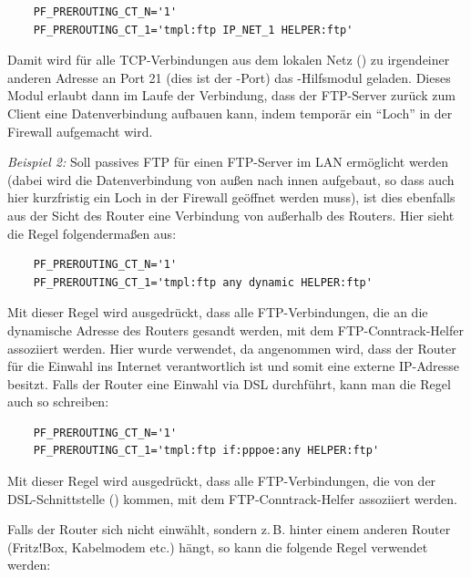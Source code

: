 \begin{example}
\begin{verbatim}
    PF_PREROUTING_CT_N='1'
    PF_PREROUTING_CT_1='tmpl:ftp IP_NET_1 HELPER:ftp'
\end{verbatim}
\end{example}

  Damit wird für alle TCP-Verbindungen aus dem lokalen Netz ()
  zu irgendeiner anderen Adresse an Port 21 (dies ist der -Port)
  das -Hilfsmodul geladen. Dieses Modul erlaubt dann im Laufe
  der Verbindung, dass der FTP-Server zurück zum Client eine Datenverbindung
  aufbauen kann, indem temporär ein ``Loch'' in der Firewall aufgemacht wird.

  \emph{Beispiel 2:} Soll passives FTP für einen FTP-Server im LAN ermöglicht
  werden (dabei wird die Datenverbindung von außen nach innen aufgebaut, so
  dass auch hier kurzfristig ein Loch in der Firewall geöffnet werden muss),
  ist dies ebenfalls aus der Sicht des Router eine Verbindung von außerhalb des
  Routers. Hier sieht die Regel folgendermaßen aus:

\begin{example}
\begin{verbatim}
    PF_PREROUTING_CT_N='1'
    PF_PREROUTING_CT_1='tmpl:ftp any dynamic HELPER:ftp'
\end{verbatim}
\end{example}

  Mit dieser Regel wird ausgedrückt, dass alle FTP-Verbindungen, die an die
  dynamische Adresse des Routers gesandt werden, mit dem FTP-Conntrack-Helfer
  assoziiert werden. Hier wurde  verwendet, da angenommen
  wird, dass der Router für die Einwahl ins Internet verantwortlich ist und
  somit eine externe IP-Adresse besitzt. Falls der Router eine Einwahl via
  DSL durchführt, kann man die Regel auch so schreiben:
  
\begin{example}
\begin{verbatim}
    PF_PREROUTING_CT_N='1'
    PF_PREROUTING_CT_1='tmpl:ftp if:pppoe:any HELPER:ftp'
\end{verbatim}
\end{example}

  Mit dieser Regel wird ausgedrückt, dass alle FTP-Verbindungen, die von der
  DSL-Schnitt\-stelle () kommen, mit dem FTP-Conntrack-Helfer
  assoziiert werden.

  Falls der Router sich nicht einwählt, sondern z.\,B.
  hinter einem anderen Router (Fritz!Box, Kabelmodem etc.) hängt, so kann die
  folgende Regel verwendet werden:

